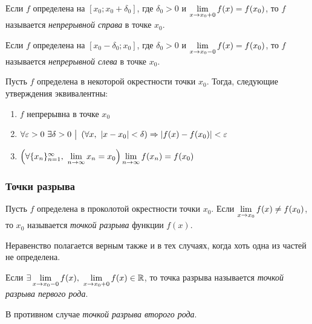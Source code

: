 \begin{definition}
	Если $f$ определена на $[x_0; x_0 + \delta_0]$, где $\delta_0 > 0$ и $\lim\limits_{x \to x_0 + 0} f(x) = f(x_0)$, то $f$ называется \textit{непрерывной справа} в точке $x_0$.
\end{definition}

\begin{definition}
	Если $f$ определена на $[x_0 - \delta_0; x_0]$, где $\delta_0 > 0$ и $\lim\limits_{x \to x_0 - 0} f(x) = f(x_0)$, то $f$ называется \textit{непрерывной слева} в точке $x_0$.
\end{definition}

\begin{theorem}
	Пусть $f$ определена в некоторой окрестности точки $x_0$. Тогда, следующие утверждения эквивалентны:
	\begin{enumerate}
		\item $f$ непрерывна в точке $x_0$
		\item $\forall \varepsilon > 0\ \exists \delta > 0 \ \big|\  \left(\forall x,\ |x - x_0| < \delta\right) \Rightarrow |f(x) - f(x_0)| < \varepsilon$
		\item $\left(\forall \{x_n\}_{n = 1}^\infty,\ \liml_{n \to \infty} x_n = x_0\right) \liml_{n \to \infty} f(x_n) = f(x_0)$
	\end{enumerate}
\end{theorem}

\subsubsection*{Точки разрыва}

\begin{definition}
	Пусть $f$ определена в проколотой окрестности точки $x_0$. Если $\lim\limits_{x \to x_0} f(x) \neq f(x_0)$, то $x_0$ называется \textit{точкой разрыва} функции $f(x)$.
\end{definition}

\begin{note}
	Неравенство полагается верным также и в тех случаях, когда хоть одна из частей не определена.
\end{note}

\begin{definition}
	Если $\exists \liml_{x \to x_0-0} f(x),\ \liml_{x \to x_0+0} f(x) \in \R$, то точка разрыва называется \textit{точкой разрыва первого рода}.
	
	В противном случае \textit{точкой разрыва второго рода}.
\end{definition}

